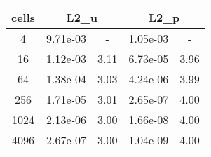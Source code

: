 \documentclass[10pt]{report}
\begin{document}
\begin{table}[H]
\begin{center}
\begin{tabular}{|c|c|c|c|c|} \hline
cells & 
\multicolumn{2}{|c|}{L2_u} & 
\multicolumn{2}{|c|}{L2_p}\\ \hline
4 & 9.71e-03 & - & 1.05e-03 & -\\ \hline
16 & 1.12e-03 & 3.11 & 6.73e-05 & 3.96\\ \hline
64 & 1.38e-04 & 3.03 & 4.24e-06 & 3.99\\ \hline
256 & 1.71e-05 & 3.01 & 2.65e-07 & 4.00\\ \hline
1024 & 2.13e-06 & 3.00 & 1.66e-08 & 4.00\\ \hline
4096 & 2.67e-07 & 3.00 & 1.04e-09 & 4.00\\ \hline
\end{tabular}
\end{center}
\end{table}
\end{document}
